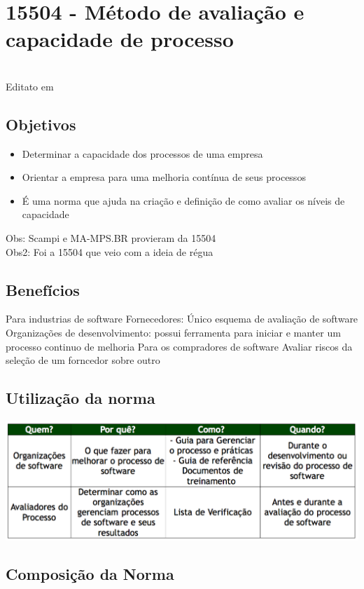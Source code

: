 \documentclass{article}
\begin{document}
\section{15504 - Método de avaliação e capacidade de processo } 
\date{28 de Abril de 2014}\\
Editato em \date{22 de Outubro de 2014}
\subsection{Objetivos}
	\begin{itemize}
	\item Determinar a capacidade dos processos de uma empresa
	\item Orientar a empresa para uma melhoria contínua de seus processos
	\item É uma norma que ajuda na criação e definição de como avaliar os níveis de capacidade
	\end{itemize}
	
	Obs: Scampi e MA-MPS.BR provieram da 15504 \\
	Obs2: Foi a 15504 que veio com a ideia de régua
\subsection{Benefícios}
	Para industrias de software
		Fornecedores: Único esquema de avaliação de software
		Organizações de desenvolvimento: possui ferramenta para iniciar e manter um processo continuo de melhoria
	Para os compradores de software	
		Avaliar riscos da seleção de um forncedor sobre outro

\subsection{Utilização da norma}

	\includegraphics[scale=0.25]{utilizacao_norma}
\subsection{Composição da Norma}
\end{document}
